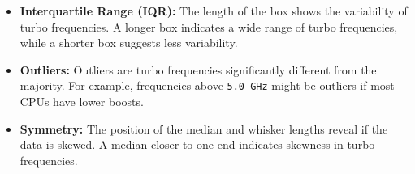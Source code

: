 \documentclass{article}
\begin{document}
\begin{itemize}
\begin{itemize}
\begin{itemize}
				\item \textbf{Interquartile Range (IQR):} The length of the box shows the variability of turbo frequencies. A longer box indicates a wide range of turbo frequencies, while a shorter box suggests less variability.
				\item \textbf{Outliers:} Outliers are turbo frequencies significantly different from the majority. For example, frequencies above \texttt{5.0 GHz} might be outliers if most CPUs have lower boosts.
				\item \textbf{Symmetry:} The position of the median and whisker lengths reveal if the data is skewed. A median closer to one end indicates skewness in turbo frequencies.
			\end{itemize}
		\end{itemize}
	\end{itemize}
\end{document}
